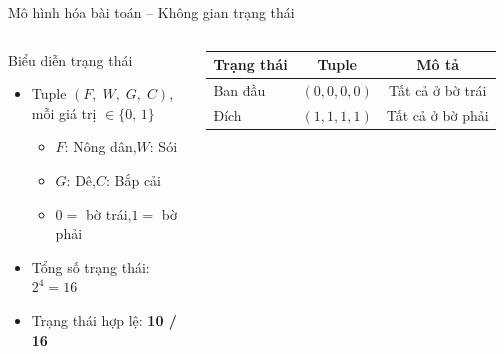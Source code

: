 \documentclass[aspectratio=169,10pt]{beamer}
\begin{document}
\begin{frame}{Mô hình hóa bài toán -- Không gian trạng thái}
\begin{columns}[T,onlytextwidth]
\begin{block}{Biểu diễn trạng thái}
\begin{itemize}
  \item Tuple $(F,\;W,\;G,\;C)$, mỗi giá trị $\in \{0,\,1\}$
  \begin{itemize}
    \item $F$: Nông dân,\quad $W$: Sói
    \item $G$: Dê,\quad $C$: Bắp cải
    \item $0 =$ bờ trái,\quad $1 =$ bờ phải
  \end{itemize}
  \item Tổng số trạng thái: $2^4 = 16$
  \item Trạng thái hợp lệ: \textbf{10 / 16}
\end{itemize}
\end{block}
\vspace{0.3cm}
\begin{tabular}{lcc}
\hline
\textbf{Trạng thái} & \textbf{Tuple} & \textbf{Mô tả} \\
\hline
Ban đầu & $(0,0,0,0)$ & Tất cả ở bờ trái \\
Đích & $(1,1,1,1)$ & Tất cả ở bờ phải \\
\hline
\end{tabular}


\end{columns}
\end{frame}
\end{document}
